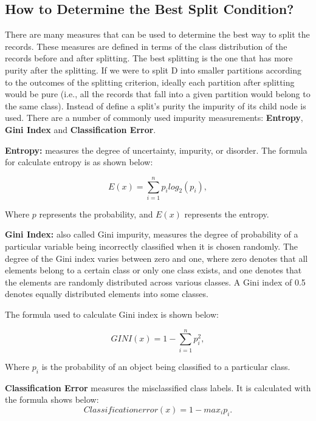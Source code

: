 \documentclass[
]{book}
\begin{document}
\hypertarget{how-to-determine-the-best-split-condition}{%
\subsection{How to Determine the Best Split Condition?}\label{how-to-determine-the-best-split-condition}}

There are many measures that can be used to determine the best way to split the records. These measures are defined in terms of the class distribution of the records before and after splitting. The best splitting is the one that has more purity after the splitting. If we were to split D into smaller partitions according to the outcomes of the splitting criterion, ideally each partition after splitting would be pure (i.e., all the records that fall into a given partition would belong to the same class). Instead of define a split's purity the impurity of its child node is used. There are a number of commonly used impurity measurements: \textbf{Entropy}, \textbf{Gini Index} and \textbf{Classification Error}.

\textbf{Entropy:} measures the degree of uncertainty, impurity, or disorder. The formula for calculate entropy is as shown below:

\begin{equation} 
E(x)= ∑_{i=1}^{n}p_ilog_2(p_i),
  \label{eq:entropy}
\end{equation}

Where \(p\) represents the probability, and \(E(x)\) represents the entropy.

\textbf{Gini Index:} also called Gini impurity, measures the degree of probability of a particular variable being incorrectly classified when it is chosen randomly. The degree of the Gini index varies between zero and one, where zero denotes that all elements belong to a certain class or only one class exists, and one denotes that the elements are randomly distributed across various classes. A Gini index of 0.5 denotes equally distributed elements into some classes.

The formula used to calculate Gini index is shown below:

\begin{equation} 
GINI(x) = 1- ∑_{i=1}^{n}p_i^2,
  \label{eq:Gini}
\end{equation}

Where \(p_i\) is the probability of an object being classified to a particular class.

\textbf{Classification Error} measures the misclassified class labels. It is calculated with the formula shows below:
\begin{equation} 
Classification error(x)= 1 - max_{i}p_i.
  \label{eq:clerror}
\end{equation}
\end{document}
